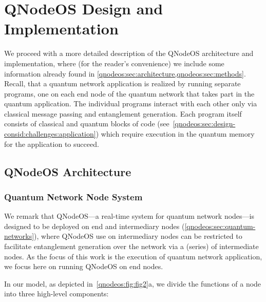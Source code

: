 \section{QNodeOS Design and Implementation}
\label{qnodeos:sec:design}

We proceed with a more detailed description of the \ac{QNodeOS} architecture and implementation, where (for the reader's convenience) we include some information already found in \cref{qnodeos:sec:architecture,qnodeos:sec:methods}. Recall, that a quantum network application is realized by running separate programs, one on each end node of the quantum network that takes part in the quantum application. The individual programs interact with each other only via classical message passing and entanglement generation. Each program itself consists of classical and quantum blocks of code (see~\cref{qnodeos:sec:design-consid:challenges:application}) which require execution in the quantum memory for the application to succeed.

\subsection{QNodeOS Architecture}
\label{qnodeos:sec:appendix-arch}

\subsubsection{Quantum Network Node System}
\label{qnodeos:sec:appendix-arch-node_system}

We remark that \ac{QNodeOS}---a real-time system for quantum network nodes---is designed to be deployed on end and intermediary nodes (\cref{qnodeos:sec:quantum-networks}), where \ac{QNodeOS} use on intermediary nodes can be restricted to facilitate entanglement generation over the network via a (series) of intermediate nodes.
As the focus of this work is the execution of quantum network application, we focus here on running \ac{QNodeOS} on end nodes.

In our model, as depicted in~\cref{qnodeos:fig:fig2}a, we divide the functions of a node into three high-level components:

